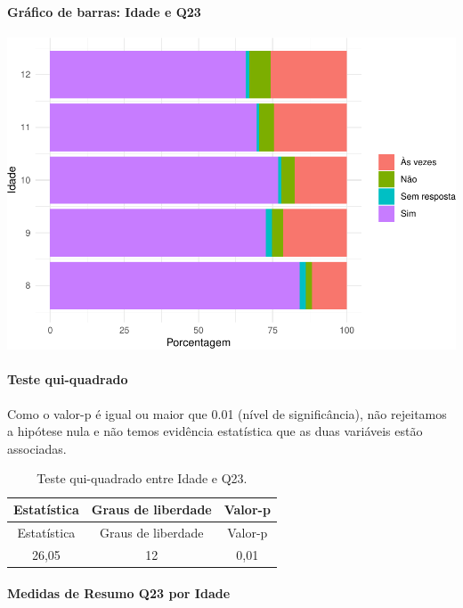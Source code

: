 \documentclass[]{article}
\let\oldparagraph\paragraph
\renewcommand{\paragraph}[1]{\oldparagraph{#1}\mbox{}}
\begin{document}
\hypertarget{gruxe1fico-de-barras-idade-e-q23}{%
\paragraph{Gráfico de barras: Idade e Q23}\label{gruxe1fico-de-barras-idade-e-q23}}

\begin{center}\includegraphics[width=0.75\linewidth]{relatorio_covid19_files/figure-latex/unnamed-chunk-565-1} \end{center}

\hypertarget{teste-qui-quadrado-49}{%
\paragraph{Teste qui-quadrado}\label{teste-qui-quadrado-49}}

Como o valor-p é igual ou maior que 0.01 (nível de significância), não rejeitamos a hipótese nula e não temos evidência estatística que as duas variáveis estão associadas.

\begin{longtable}[]{@{}ccc@{}}
\caption{\label{tab:unnamed-chunk-567}Teste qui-quadrado entre Idade e Q23.}\tabularnewline
\toprule
Estatística & Graus de liberdade & Valor-p\tabularnewline
\midrule
\endfirsthead
\toprule
Estatística & Graus de liberdade & Valor-p\tabularnewline
\midrule
\endhead
26,05 & 12 & 0,01\tabularnewline
\bottomrule
\end{longtable}

\cleardoublepage

\hypertarget{medidas-de-resumo-q23-por-idade}{%
\paragraph{Medidas de Resumo Q23 por Idade}\label{medidas-de-resumo-q23-por-idade}}
\end{document}

